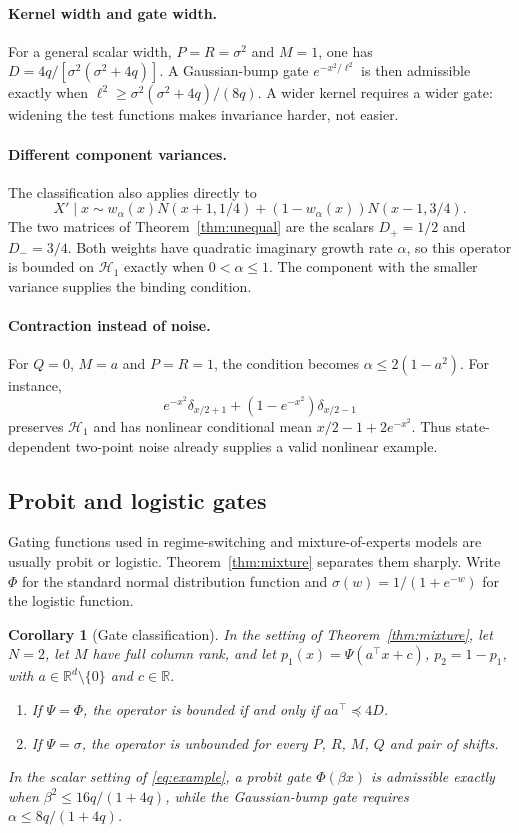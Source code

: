 \documentclass[11pt,a4paper]{article}
\newtheorem{corollary}[theorem]{Corollary}
\theoremstyle{remark}
\newcommand{\R}{\mathbb R}
\newcommand{\HH}{\mathcal H}
\begin{document}
\paragraph{Kernel width and gate width.}
For a general scalar width, $P=R=\sigma^2$ and $M=1$, one has
$D=4q/[\sigma^2(\sigma^2+4q)]$. A Gaussian-bump gate
$e^{-x^2/\ell^2}$ is then admissible exactly when
$\ell^2\ge\sigma^2(\sigma^2+4q)/(8q)$. A wider kernel requires a wider
gate: widening the test functions makes invariance harder, not easier.

\paragraph{Different component variances.}
The classification also applies directly to
\[
 X'\mid x\sim w_\alpha(x)N(x+1,1/4)
             +(1-w_\alpha(x))N(x-1,3/4).
\]
The two matrices of Theorem~\ref{thm:unequal} are the scalars
$D_+=1/2$ and $D_-=3/4$. Both weights have quadratic imaginary growth
rate $\alpha$, so this operator is bounded on $\HH_1$ exactly when
$0<\alpha\le1$. The component with the smaller variance supplies the
binding condition.

\paragraph{Contraction instead of noise.}
For $Q=0$, $M=a$ and $P=R=1$, the condition becomes
$\alpha\le2(1-a^2)$. For instance,
\[
 e^{-x^2}\delta_{x/2+1}
       +(1-e^{-x^2})\delta_{x/2-1}
\]
preserves $\HH_1$ and has nonlinear conditional mean
$x/2-1+2e^{-x^2}$. Thus state-dependent two-point noise
already supplies a valid nonlinear example.

\subsection{Probit and logistic gates}

Gating functions used in regime-switching and mixture-of-experts models
are usually probit or logistic. Theorem~\ref{thm:mixture} separates them
sharply. Write $\Phi$ for the standard normal distribution function and
$\sigma(w)=1/(1+e^{-w})$ for the logistic function.

\begin{corollary}[Gate classification]\label{cor:gates}
In the setting of Theorem~\ref{thm:mixture}, let $N=2$, let $M$ have
full column rank, and let $p_1(x)=\Psi(a^\top x+c)$, $p_2=1-p_1$, with
$a\in\R^d\setminus\{0\}$ and $c\in\R$.
\begin{enumerate}
\item If $\Psi=\Phi$, the operator is bounded if and only if
$aa^\top\preceq4D$.
\item If $\Psi=\sigma$, the operator is unbounded for every $P$, $R$, $M$,
$Q$ and pair of shifts.
\end{enumerate}
In the scalar setting of \eqref{eq:example}, a probit gate $\Phi(\beta
x)$ is admissible exactly when $\beta^2\le16q/(1+4q)$, while the
Gaussian-bump gate requires $\alpha\le8q/(1+4q)$.
\end{corollary}
\end{document}
